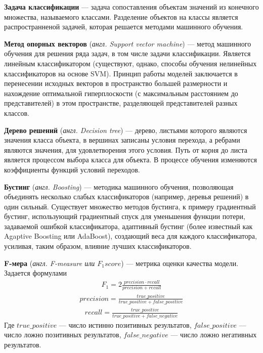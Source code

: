 \documentclass[times,specification,annotation]{itmo-student-thesis}
\begin{document}
\textbf{Задача классификации} --- задача сопоставления объектам значений из конечного множества, называемого классами.  Разделение объектов на классы является распространненой задачей, которая решается методами машинного обучения. 

\textbf{Метод опорных векторов} \cite{cortest1995} (\textit{англ. Support vector machine})  --- метод машинного обучения для решения ряда задач, в том числе задачи классификации. Является линейным классификатором (существуют, однако, способы обучения нелинейных классификаторов на основе SVM). Принцип работы моделей заключается в перенесении исходных векторов в пространство большей размерности и нахождение оптимальной гиперплоскости (с максимальным расстоянием до представителей) в этом пространстве, разделяющей представителей разных классов. 

\textbf{Дерево решений} \cite{quinlan1986induction} (\textit{англ. Decision tree}) --- дерево, листьями которого являются значения класса объекта, в вершинах записаны условия перехода, а ребрами являются значения, для удовлетворения этого условия. Путь от корня до листа является процессом выбора класса для объекта. В процессе обучения изменяются коэффициенты функций условий переходов.   

\textbf{Бустинг} (\textit{англ. Boosting}) --- методика машинного обучения, позволяющая объединять несколько слабых классификаторов (например, деревья решений) в один сильный. Существует множество методов бустинга, к примеру градиентный бустинг\cite{friedman2002stochastic}, использующий градиентный спуск для уменьшения функции потери, задаваемой ошибкой классификатора, адаптивный бустинг (более известный как Agaptive Boosting или AdaBoost)\cite{freund1997decision}, создающий веса для каждого классификатора, усиливая, таким образом, влияние лучших классификаторов.  

\textbf{F-мера} (\textit{англ. F-measure или $F_1 score$}) --- метрика оценки качества модели. Задается формулами
 \begin{align*}
F_1 = 2 \frac{precision \cdot recall}{precision + recall}
\end{align*}
 \begin{align*}
precision = \frac{true\_positive}{true\_positive + false\_positive}
\end{align*}
 \begin{align*}
recall = \frac{true\_positive}{true\_positive + false\_negative}
\end{align*}
Где $true\_positive$ --- число истинно позитивных результатов, $false\_positive$ --- число ложно позитивных результатов, $false\_negative$ --- число ложно негативных результатов.
\end{document}
